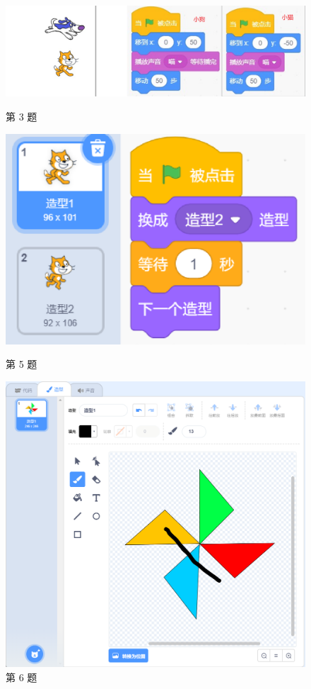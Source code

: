 \documentclass[10pt, a4paper]{article}
\begin{document}
\begin{enumerate}
        \begin{figure}[htbp]
            \begin{minipage}[t]{.4\textwidth}
                \centering
                \includegraphics[width=\textwidth]{3.png}
                \caption*{第 3 题}
            \end{minipage}
            \begin{minipage}[t]{.3\textwidth}
                \centering
                \includegraphics[width=.6\textwidth]{5.png}
                \caption*{第 5 题}
            \end{minipage}
            \begin{minipage}[t]{.28\textwidth}
                \centering
                \includegraphics[width=.6\textwidth]{6.png}
                \caption*{第 6 题}
            \end{minipage}
        \end{figure}


\end{enumerate}
\end{document}
